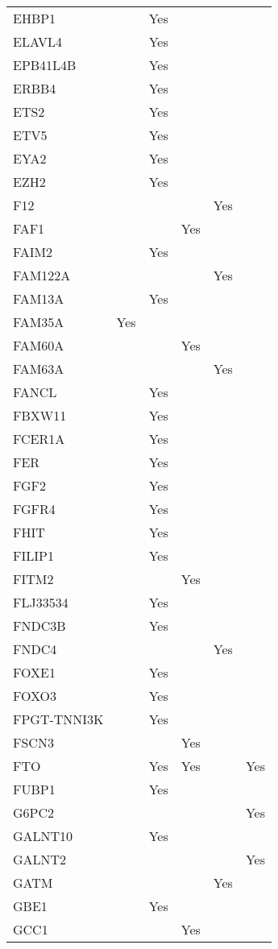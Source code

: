 \documentclass[]{report}
\begin{document}
\begin{longtable}[t]{llllll}
EHBP1 &  & Yes &  &  & \\
ELAVL4 &  & Yes &  &  & \\
EPB41L4B &  & Yes &  &  & \\
ERBB4 &  & Yes &  &  & \\
ETS2 &  & Yes &  &  & \\
ETV5 &  & Yes &  &  & \\
EYA2 &  & Yes &  &  & \\
EZH2 &  & Yes &  &  & \\
F12 &  &  &  & Yes & \\
FAF1 &  &  & Yes &  & \\
FAIM2 &  & Yes &  &  & \\
FAM122A &  &  &  & Yes & \\
FAM13A &  & Yes &  &  & \\
FAM35A & Yes &  &  &  & \\
FAM60A &  &  & Yes &  & \\
FAM63A &  &  &  & Yes & \\
FANCL &  & Yes &  &  & \\
FBXW11 &  & Yes &  &  & \\
FCER1A &  & Yes &  &  & \\
FER &  & Yes &  &  & \\
FGF2 &  & Yes &  &  & \\
FGFR4 &  & Yes &  &  & \\
FHIT &  & Yes &  &  & \\
FILIP1 &  & Yes &  &  & \\
FITM2 &  &  & Yes &  & \\
FLJ33534 &  & Yes &  &  & \\
FNDC3B &  & Yes &  &  & \\
FNDC4 &  &  &  & Yes & \\
FOXE1 &  & Yes &  &  & \\
FOXO3 &  & Yes &  &  & \\
FPGT-TNNI3K &  & Yes &  &  & \\
FSCN3 &  &  & Yes &  & \\
FTO &  & Yes & Yes &  & Yes\\
FUBP1 &  & Yes &  &  & \\
G6PC2 &  &  &  &  & Yes\\
GALNT10 &  & Yes &  &  & \\
GALNT2 &  &  &  &  & Yes\\
GATM &  &  &  & Yes & \\
GBE1 &  & Yes &  &  & \\
GCC1 &  &  & Yes &  & \\

\end{longtable}
\end{document}
